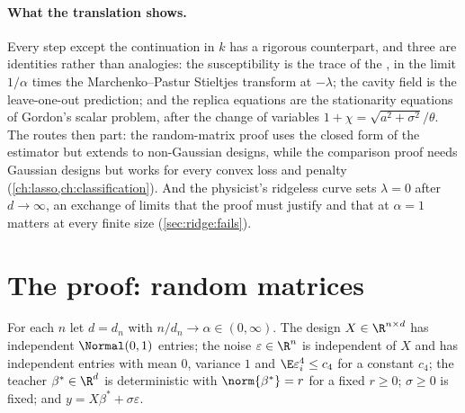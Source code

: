 \begin{refsection}
\paragraph{What the translation shows.} Every step except the continuation in $k$ has a rigorous counterpart, and three are identities rather than analogies: the susceptibility is the trace of the , in the limit $1/\alpha$ times the Marchenko--Pastur Stieltjes transform at $-\lambda$; the cavity field is the leave-one-out prediction; and the replica equations are the stationarity equations of Gordon's scalar problem, after the change of variables $1+\chi=\sqrt{a^2+\sigma^2}/\theta$. The routes then part: the random-matrix proof uses the closed form of the estimator but extends to non-Gaussian designs, while the comparison proof needs Gaussian designs but works for every convex loss and penalty (\cref{ch:lasso,ch:classification}). And the physicist's ridgeless curve sets $\lambda=0$ after $d\to\infty$, an exchange of limits that the proof must justify and that at $\alpha=1$ matters at every finite size (\cref{sec:ridge:fails}).

\section{The proof: random matrices}\label{sec:ridge:proof}

\begin{assumption}\label{ass:ridge:model}
For each $n$ let $d=d_n$ with $n/d_n\to\alpha\in(0,\infty)$. The design $X\in\R^{n\times d}$ has independent $\Normal(0,1)$ entries; the noise $\varepsilon\in\R^n$ is independent of $X$ and has independent entries with mean $0$, variance $1$ and $\E\varepsilon_i^4\le c_4$ for a constant $c_4$; the teacher $\beta^*\in\R^d$ is deterministic with $\norm{\beta^*}=r$ for a fixed $r\ge0$; $\sigma\ge0$ is fixed; and $y=X\beta^*+\sigma\varepsilon$.
\end{assumption}


\end{refsection}
